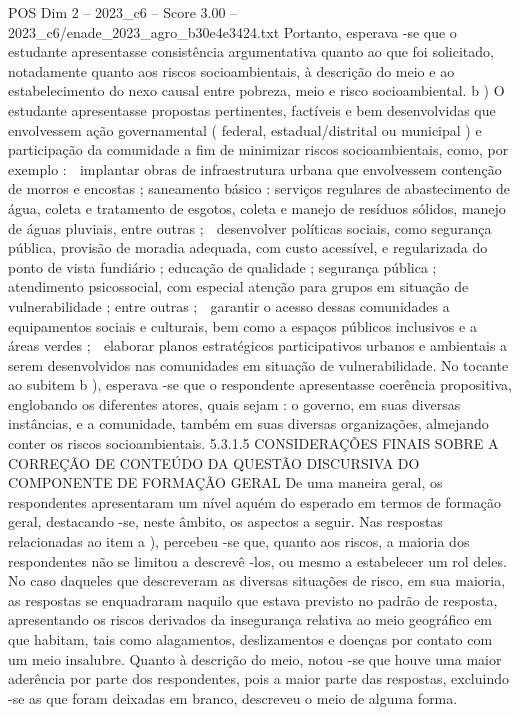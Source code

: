 \begin{textsample}{POS Dim 2 – 2023\_c6 – Score 3.00 – 2023\_c6/enade\_2023\_agro\_b30e4e3424.txt}
Portanto, esperava -se que o estudante apresentasse consistência argumentativa quanto ao que foi solicitado, notadamente quanto aos riscos socioambientais, à descrição do meio e ao estabelecimento do nexo causal entre pobreza, meio e risco socioambiental. b ) O estudante apresentasse propostas pertinentes, factíveis e bem desenvolvidas que envolvessem ação governamental ( federal, estadual/distrital ou municipal ) e participação da comunidade a fim de minimizar riscos socioambientais, como, por exemplo :  implantar obras de infraestrutura urbana que envolvessem contenção de morros e encostas ; saneamento básico : serviços regulares de abastecimento de água, coleta e tratamento de esgotos, coleta e manejo de resíduos sólidos, manejo de águas pluviais, entre outras ;  desenvolver políticas sociais, como segurança pública, provisão de moradia adequada, com custo acessível, e regularizada do ponto de vista fundiário ; educação de qualidade ; segurança pública ; atendimento psicossocial, com especial atenção para grupos em situação de vulnerabilidade ; entre outras ;  garantir o acesso dessas comunidades a equipamentos sociais e culturais, bem como a espaços públicos inclusivos e a áreas verdes ;  elaborar planos estratégicos participativos urbanos e ambientais a serem desenvolvidos nas comunidades em situação de vulnerabilidade.
No tocante ao subitem b ), esperava -se que o respondente apresentasse coerência propositiva, englobando os diferentes atores, quais sejam : o governo, em suas diversas instâncias, e a comunidade, também em suas diversas organizações, almejando conter os riscos socioambientais. 5.3.1.5 CONSIDERAÇÕES FINAIS SOBRE A CORREÇÃO DE CONTEÚDO DA QUESTÃO DISCURSIVA DO COMPONENTE DE FORMAÇÃO GERAL De uma maneira geral, os respondentes apresentaram um nível aquém do esperado em termos de formação geral, destacando -se, neste âmbito, os aspectos a seguir.
Nas respostas relacionadas ao item a ), percebeu -se que, quanto aos riscos, a maioria dos respondentes não se limitou a descrevê -los, ou mesmo a estabelecer um rol deles.
No caso daqueles que descreveram as diversas situações de risco, em sua maioria, as respostas se enquadraram naquilo que estava previsto no padrão de resposta, apresentando os riscos derivados da insegurança relativa ao meio geográfico em que habitam, tais como alagamentos, deslizamentos e doenças por contato com um meio insalubre.
Quanto à descrição do meio, notou -se que houve uma maior aderência por parte dos respondentes, pois a maior parte das respostas, excluindo -se as que foram deixadas em branco, descreveu o meio de alguma forma.

\end{textsample}

